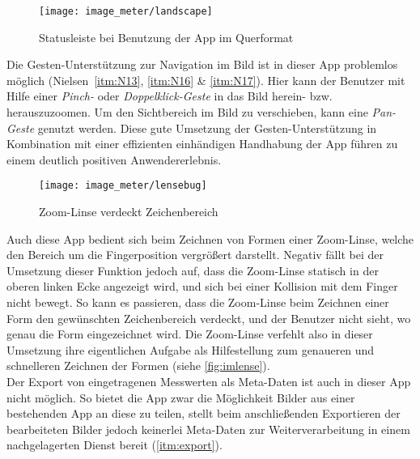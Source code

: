 \begin{figure}[h]
  \centering
  \texttt{[image: image\_meter/landscape]}
  \caption{Statusleiste bei Benutzung der App im Querformat}
  \label{fig:imlandscape}
\end{figure}

Die Gesten-Unterstützung zur Navigation im Bild ist in dieser App problemlos möglich (Nielsen~\autoref{itm:N13}, \autoref{itm:N16} \& \autoref{itm:N17}).
Hier kann der Benutzer mit Hilfe einer \emph{Pinch-} oder \emph{Doppelklick-Geste} in das Bild herein- bzw. herauszuzoomen.
Um den Sichtbereich im Bild zu verschieben, kann eine \emph{Pan-Geste} genutzt werden.
Diese gute Umsetzung der Gesten-Unterstützung in Kombination mit einer effizienten einhändigen Handhabung der App führen zu einem deutlich positiven Anwendererlebnis.

\begin{wrapfigure}{R}{0.4\textwidth}
  \centering
  \texttt{[image: image\_meter/lensebug]}
  \caption{Zoom-Linse verdeckt Zeichenbereich}
  \label{fig:imlense}
\end{wrapfigure}

Auch diese App bedient sich beim Zeichnen von Formen einer Zoom-Linse, welche den Bereich um die Fingerposition vergrößert darstellt.
Negativ fällt bei der Umsetzung dieser Funktion jedoch auf, dass die Zoom-Linse statisch in der oberen linken Ecke angezeigt wird, und sich bei einer Kollision mit dem Finger nicht bewegt.
So kann es passieren, dass die Zoom-Linse beim Zeichnen einer Form den gewünschten Zeichenbereich verdeckt, und der Benutzer nicht sieht, wo genau die Form eingezeichnet wird.
Die Zoom-Linse verfehlt also in dieser Umsetzung ihre eigentlichen Aufgabe als Hilfestellung zum genaueren und schnelleren Zeichnen der Formen (siehe \autoref{fig:imlense}). \\

Der Export von eingetragenen Messwerten als Meta-Daten ist auch in dieser App nicht möglich.
So bietet die App zwar die Möglichkeit Bilder aus einer bestehenden App an diese zu teilen, stellt beim anschließenden Exportieren der bearbeiteten Bilder jedoch keinerlei Meta-Daten zur Weiterverarbeitung in einem nachgelagerten Dienst bereit (\autoref{itm:export}). \\

